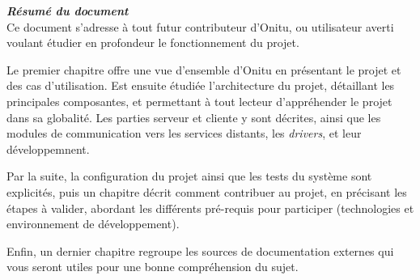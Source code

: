\thispagestyle{empty}
\vspace*{10mm}

\textbf{\emph{\textcolor{onitu}{\large{Résumé du document} } } }\\

Ce document s'adresse à tout futur contributeur d'Onitu, ou utilisateur averti voulant étudier en profondeur le fonctionnement du projet.

Le premier chapitre offre une vue d'ensemble d'Onitu en présentant le projet et des cas d'utilisation. Est ensuite étudiée l'architecture du projet, détaillant les principales composantes, et permettant à tout lecteur d'appréhender le projet dans sa globalité. Les parties serveur et cliente y sont décrites, ainsi que les modules de communication vers les services distants, les \emph{drivers}, et leur développemnent.

Par la suite, la configuration du projet ainsi que les tests du système sont explicités, puis un chapitre décrit comment contribuer au projet, en précisant les étapes à valider, abordant les différents pré-requis pour participer (technologies et environnement de développement).

Enfin, un dernier chapitre regroupe les sources de documentation externes qui vous seront utiles pour une bonne compréhension du sujet.

\clearpage
